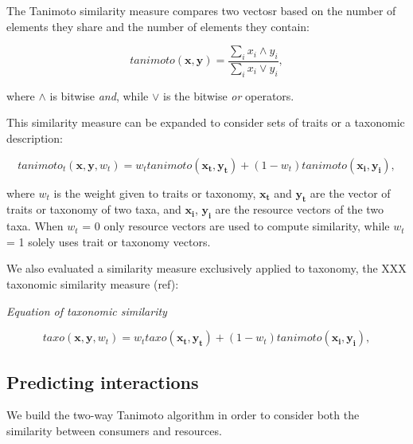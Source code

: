 \documentclass[letterpaper]{article}
\begin{document}
The Tanimoto similarity measure compares two vectosr based on the number of elements they share and the number of elements they contain:

\begin{equation}
  tanimoto(\mathbf{x}, \mathbf{y}) = \frac{\sum_i x_i \land y_i}{\sum_i x_i \lor y_i},
\end{equation}

where $\land$ is bitwise \emph{and}, while $\lor$ is the bitwise \emph{or} operators.

This similarity measure can be expanded to consider sets of traits or a taxonomic description:

\begin{equation}
  tanimoto_t(\mathbf{x}, \mathbf{y}, w_t) = w_ttanimoto(\mathbf{x_t}, \mathbf{y_t}) + (1 - w_t)tanimoto(\mathbf{x_i}, \mathbf{y_i}),
\end{equation}

where $w_t$ is the weight given to traits or taxonomy, $\mathbf{x_t}$ and $\mathbf{y_t}$ are the vector of traits or taxonomy of two taxa, and $\mathbf{x_i}$, $\mathbf{y_i}$ are the resource vectors of the two taxa. When $w_t$ = 0 only resource vectors are used to compute similarity, while $w_t$ = 1 solely uses trait or taxonomy vectors.

We also evaluated a similarity measure exclusively applied to taxonomy, the XXX taxonomic similarity measure (ref):

\textit{Equation of taxonomic similarity}

\begin{equation}
  taxo(\mathbf{x}, \mathbf{y}, w_t) = w_ttaxo(\mathbf{x_t}, \mathbf{y_t}) + (1 - w_t)tanimoto(\mathbf{x_i}, \mathbf{y_i}),
\end{equation}





%
%
%



  \subsection{Predicting interactions}
We build the two-way Tanimoto algorithm in order to consider both the similarity between consumers and resources.
\end{document}
